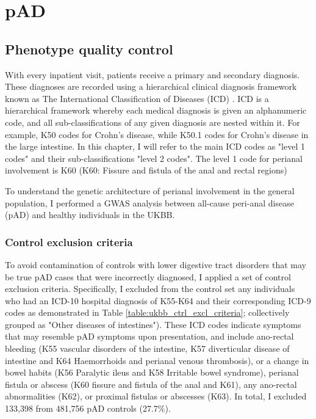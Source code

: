 \chapter{pAD}

\ifpdf
    \graphicspath{{Chapter3/Figs/Raster/}{Chapter3/Figs/PDF/}{Chapter3/Figs/}}
\else
    \graphicspath{{Chapter3/Figs/Vector/}{Chapter3/Figs/}}
\fi

\section{Phenotype quality control}
With every inpatient visit, patients receive a primary and secondary diagnosis. These diagnoses are recorded using a hierarchical clinical diagnosis framework known as The International Classification of Diseases (ICD) \cite{Hirsch2016-mw}. ICD is a hierarchical framework whereby each medical diagnosis is given an alphanumeric code, and all sub-classifications of any given diagnosis are nested within it. For example, K50 codes for Crohn's disease, while K50.1 codes for Crohn's disease in the large intestine. In this chapter, I will refer to the main ICD codes as "level 1 codes" and their sub-classifications "level 2 codes". The level 1 code for perianal involvement is K60 (K60: Fissure and fistula of the anal and rectal regions)

To understand the genetic architecture of perianal involvement in the general population, I performed a GWAS analysis between all-cause peri-anal disease (pAD) and healthy individuals in the UKBB. 

\subsection{Control exclusion criteria}
To avoid contamination of controls with lower digestive tract disorders that may be true pAD cases that were incorrectly diagnosed, I applied a set of control exclusion criteria. Specifically, I excluded from the control set any individuals who had an ICD-10 hospital diagnosis of K55-K64 and their corresponding ICD-9 codes as demonstrated in Table \ref{table:ukbb_ctrl_excl_criteria}; collectively grouped as "Other diseases of intestines"). These ICD codes indicate symptoms that may resemble pAD symptoms upon presentation, and include ano-rectal bleeding (K55 vascular disorders of the intestine, K57 diverticular disease of intestine and K64 Haemorrhoids and perianal venous thrombosis), or a change in bowel habits (K56 Paralytic ileus and K58 Irritable bowel syndrome), perianal fistula or abscess (K60 fissure and fistula of the anal  and K61), any ano-rectal abnormalities (K62), or proximal fistulas or abscesses (K63). In total, I excluded 133,398 from 481,756 pAD controls (27.7\%).


